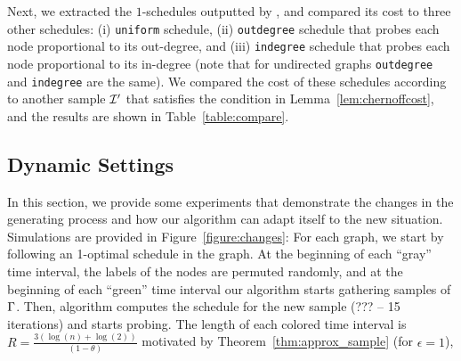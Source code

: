 % 
% 
% 




Next, we extracted the $1$-schedules  outputted by \algonameapx, and compared its cost to three other  schedules: (i) \texttt{uniform} schedule, (ii) \texttt{outdegree} schedule that probes each node proportional to its out-degree, and (iii) \texttt{indegree} schedule that probes each node proportional to its in-degree (note that for undirected graphs \texttt{outdegree} and \texttt{indegree} are the same). We compared the cost of these schedules according to another sample $\mathcal{I}'$ that satisfies the condition in Lemma~\ref{lem:chernoffcost}, and the results are shown in Table~\ref{table:compare}.



\subsection{Dynamic Settings}\label{sec:dynset}
In this section, we provide some experiments that demonstrate the changes in the
generating process and how our algorithm can adapt itself to the new situation.
Simulations are provided in Figure~\ref{figure:changes}: For each graph, we
start by following an 1-optimal schedule in the graph. At the beginning of each
``gray'' time interval, the labels of the nodes are permuted randomly, and at
the beginning of each ``green'' time interval our algorithm starts gathering
samples of $\Gamma$. Then, algorithm computes the schedule for the new sample
(??? -- 15 iterations) and starts probing. The length of each colored time
interval is $R = \frac{3(\log(n)+\log(2))}{(1-\theta)}$ motivated by
Theorem~\ref{thm:approx_sample} (for $\epsilon=1$),  

